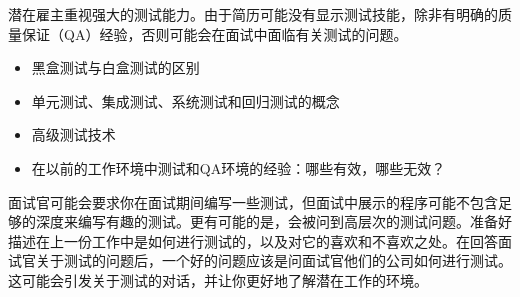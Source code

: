 
潜在雇主重视强大的测试能力。由于简历可能没有显示测试技能，除非有明确的质量保证（QA）经验，否则可能会在面试中面临有关测试的问题。


\begin{itemize}
\item
黑盒测试与白盒测试的区别

\item
单元测试、集成测试、系统测试和回归测试的概念

\item
高级测试技术

\item
在以前的工作环境中测试和QA环境的经验：哪些有效，哪些无效？
\end{itemize}


面试官可能会要求你在面试期间编写一些测试，但面试中展示的程序可能不包含足够的深度来编写有趣的测试。更有可能的是，会被问到高层次的测试问题。准备好描述在上一份工作中是如何进行测试的，以及对它的喜欢和不喜欢之处。在回答面试官关于测试的问题后，一个好的问题应该是问面试官他们的公司如何进行测试。这可能会引发关于测试的对话，并让你更好地了解潜在工作的环境。


